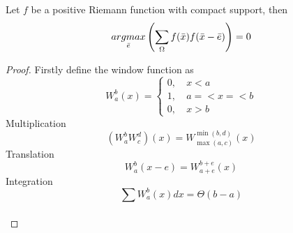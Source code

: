\begin{theorem} %
    \label{thm:response_max}
    Let $f$ be a positive Riemann function with compact support, then
    \begin{equation}
        \underset{\bar{e}}{argmax}
            \left(
            \sum\limits_{\Omega}{f(\bar{x})f(\bar{x}-\bar{e})}
            \right)
            =0
    \end{equation}
\end{theorem}
\begin{proof}
    Firstly define the window function as
    \begin{equation}
        W_a^b(x)=
        \begin{cases}
            0,~& x<a\\
            1,~& a=<x=<b\\
            0,~& x>b
        \end{cases}
    \end{equation}
    Multiplication
    \begin{equation}
        (W_a^bW_c^d)(x)=W_{\max(a,c)}^{\min(b,d)}(x)
    \end{equation}
    Translation
    \begin{equation}
        W_a^b(x-e)=W_{a+e}^{b+e}(x)
    \end{equation}
    Integration
    \begin{equation}
        \label{eq:int_window}
        \sum{W_a^b(x)dx}=\Theta(b-a)
    \end{equation}

    \begin{equation}
        \begin{array}{c}
            

\end{array}
\end{equation}
\end{proof}
